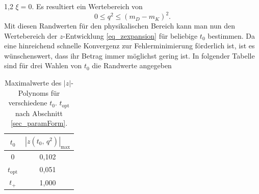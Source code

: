 \documentclass[11pt,a4paper,twoside]{report}
\begin{document}
\begin{spacing}{1,2}
$\xi = 0$. Es resultiert ein Wertebereich von
\begin{equation}
 0 \leq q^2 \leq (m_D - m_K)^2.
\end{equation}
Mit diesen Randwerten für den physikalischen Bereich kann man nun den Wertebereich der $z$-Entwicklung \eqref{eq_zexpansion} für beliebige $t_0$ bestimmen.
Da eine hinreichend schnelle Konvergenz zur Fehlerminimierung förderlich ist, ist es wünschenswert, dass ihr Betrag immer möglichst gering ist. In 
folgender Tabelle sind für drei Wahlen von $t_0$ die Randwerte angegeben
\begin{table}[h]
 \begin{tabular}{c|c}
 \toprule
  $t_0$  & $|z(t_0,\,q^2)|_\text{max}$\\
  \midrule
  0  & 0,102\\
  $t_\text{opt}$ & 0,051\\
  $t_+$ & 1,000\\
  \bottomrule\bottomrule
 \end{tabular}
\caption[Maximalwerte des $|z|$-Polynoms für verschiedene $t_0$.]{Maximalwerte des $|z|$-Polynoms für verschiedene $t_0$. $t_\text{opt}$ nach Abschnitt \ref{sec_paramForm}.}
\label{tab_zbereich}
\end{table}



\end{spacing}
\end{document}
